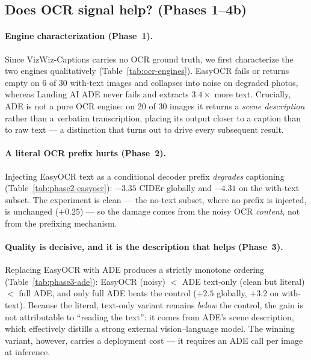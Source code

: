 \subsection{Does OCR signal help? (Phases 1--4b)}
\label{sec:res-ocr}

\paragraph{Engine characterization (Phase~1).}
Since VizWiz-Captions carries no OCR ground truth, we first characterize the two
engines qualitatively (Table~\ref{tab:ocr-engines}). EasyOCR fails or returns
empty on 6 of 30 with-text images and collapses into noise on degraded photos,
whereas Landing AI ADE never fails and extracts $3.4\times$ more text. Crucially,
ADE is not a pure OCR engine: on 20 of 30 images it returns a \emph{scene
description} rather than a verbatim transcription, placing its output closer to a
caption than to raw text --- a distinction that turns out to drive every
subsequent result.

\paragraph{A literal OCR prefix hurts (Phase~2).}
Injecting EasyOCR text as a conditional decoder prefix \emph{degrades}
captioning (Table~\ref{tab:phase2-easyocr}): $-3.35$ CIDEr globally and $-4.31$
on the with-text subset. The experiment is clean --- the no-text subset, where
no prefix is injected, is unchanged ($+0.25$) --- so the damage comes from the
noisy OCR \emph{content}, not from the prefixing mechanism.

\paragraph{Quality is decisive, and it is the description that helps (Phase~3).}
Replacing EasyOCR with ADE produces a strictly monotone ordering
(Table~\ref{tab:phase3-ade}): EasyOCR (noisy) $<$ ADE text-only (clean but
literal) $<$ full ADE, and only full ADE beats the control ($+2.5$ globally,
$+3.2$ on with-text). Because the literal, text-only variant remains \emph{below}
the control, the gain is not attributable to ``reading the text'': it comes from
ADE's scene description, which effectively distills a strong external
vision--language model. The winning variant, however, carries a deployment cost
--- it requires an ADE call per image at inference.

